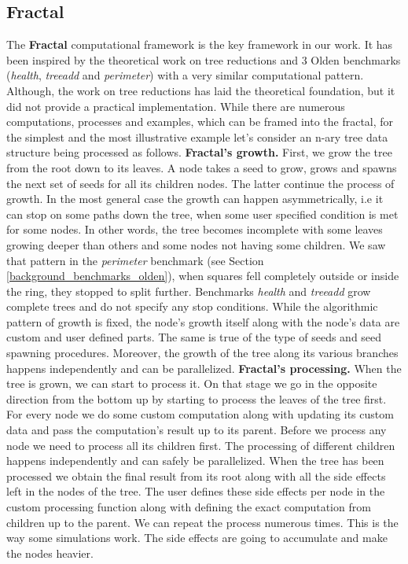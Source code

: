 \subsection{Fractal}
\label{frameworks_fractal}
\quad The \textbf{Fractal} computational framework is the key framework in our work. It has been inspired by the theoretical work on tree reductions \cite{tree-reductions-paper} and 3 Olden benchmarks (\textit{health}, \textit{treeadd} and \textit{perimeter}) with a very similar computational pattern. Although, the work on tree reductions has laid the theoretical foundation, but it did not provide a practical implementation. While there are numerous computations, processes and examples, which can be framed into the fractal, for the simplest and the most illustrative example let's consider an n-ary tree data structure being processed as follows.\newline\null
\quad \textbf{Fractal's growth.} First, we grow the tree from the root down to its leaves. A node takes a seed to grow, grows and spawns the next set of seeds for all its children nodes. The latter continue the process of growth. In the most general case the growth can happen asymmetrically, i.e it can stop on some paths down the tree, when some user specified condition is met for some nodes. In other words, the tree becomes incomplete with some leaves growing deeper than others and some nodes not having some children. We saw that pattern in the \textit{perimeter} benchmark (see Section \ref{background_benchmarks_olden}), when squares fell completely outside or inside the ring, they stopped to split further. Benchmarks \textit{health} and \textit{treeadd} grow complete trees and do not specify any stop conditions. While the algorithmic pattern of growth is fixed, the node's growth itself along with the node's data are custom and user defined parts. The same is true of the type of seeds and seed spawning procedures. Moreover, the growth of the tree along its various branches happens independently and can be parallelized.\newline\null
\quad \textbf{Fractal's processing.} When the tree is grown, we can start to process it. On that stage we go in the opposite direction from the bottom up by starting to process the leaves of the tree first. For every node we do some custom computation along with updating its custom data and pass the computation's result up to its parent. Before we process any node we need to process all its children first. The processing of different children happens independently and can safely be parallelized. When the tree has been processed we obtain the final result from its root along with all the side effects left in the nodes of the tree. The user defines these side effects per node in the custom processing function along with defining the exact computation from children up to the parent. We can repeat the process numerous times. This is the way some simulations work. The side effects are going to accumulate and make the nodes heavier.
